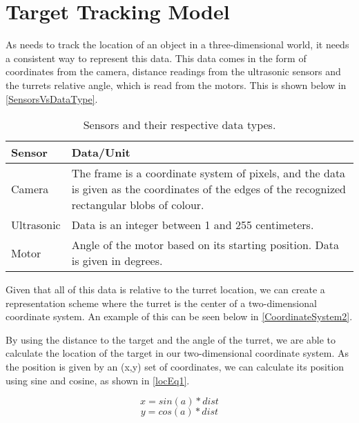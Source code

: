 \section{Target Tracking Model}\label{RepScheme}
As \name needs to track the location of an object in a three-dimensional world,
it needs a consistent way to represent this data. This data comes in the form
of coordinates from the camera, distance readings from the ultrasonic sensors
and the turrets relative angle, which is read from the motors. This is shown
below in \autoref{SensorsVsDataType}.

\begin{table}[H]
\centering
\begin{tabular}{|p{2cm}|p{12cm}|}
\hline
Sensor     & Data/Unit                                                                                                                                        \\ \hline
Camera     & The frame is a coordinate system of pixels, and the data is given as the coordinates of the edges of the recognized rectangular blobs of colour. \\ \hline
Ultrasonic & Data is an integer between 1 and 255 centimeters.                                                                                                \\ \hline
Motor      & Angle of the motor based on its starting position. Data is given in degrees.                                                                     \\ \hline
\end{tabular}
\caption{Sensors and their respective data types.}
\label{SensorsVsDataType}
\end{table}

Given that all of this data is relative to the turret location, we can create a
representation scheme where the turret is the center of a two-dimensional
coordinate system. An example of this can be seen below in
\autoref{CoordinateSystem2}.\nl

By using the distance to the target and the angle of the turret, we are able to
calculate the location of the target in our two-dimensional coordinate system.
As the position is given by an (x,y) set of coordinates, we can calculate its
position using sine and cosine, as shown in \autoref{locEq1}.

\begin{equation}\label{locEq1}
x=sin(a)*dist
\end{equation}
\begin{equation}\label{locEq2}
y=cos(a)*dist
\end{equation} 

